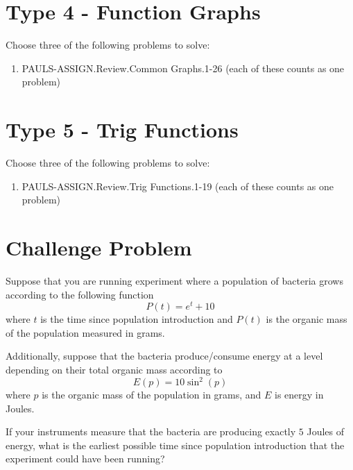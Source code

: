 \documentclass[12pt]{article}
\begin{document}
\section{Type 4 - Function Graphs}
Choose three of the following problems to solve:
\begin{enumerate}
  \item PAULS-ASSIGN.Review.Common Graphs.1-26 (each of these counts as one problem)
\end{enumerate}

\section{Type 5 - Trig Functions}
Choose three of the following problems to solve:
\begin{enumerate}
  \item PAULS-ASSIGN.Review.Trig Functions.1-19 (each of these counts as one problem) 
\end{enumerate}

\section{Challenge Problem}
Suppose that you are running experiment where a population of bacteria grows according to the following function
$$P(t) = e^t + 10$$
where $t$ is the time since population introduction and $P(t)$ is the organic mass of the population measured in grams.

Additionally, suppose that the bacteria produce/consume energy at a level depending on their total organic mass according to
$$E(p) = 10\sin^2(p)$$
where $p$ is the organic mass of the population in grams, and $E$ is energy in Joules.

If your instruments measure that the bacteria are producing exactly $5$ Joules of energy,
what is the earliest possible time since population introduction that the experiment could have been running?


\end{document}
